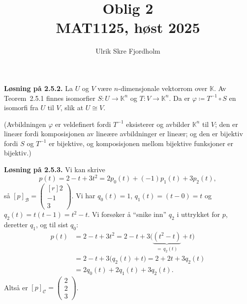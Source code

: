 \documentclass[a4paper,norsk]{article}
\title{Oblig 2 \\ MAT1125, høst 2025}
\author{Ulrik Skre Fjordholm}
\renewcommand{\phi}{\varphi}
\newcommand{\K}{\mathbb{K}}
\newcommand{\basis}{{\mathcal{B}}}
\newcommand{\basiss}{{\mathcal{C}}}
\newcommand{\from}{\colon}
\newenvironment{oppgave}[1]%
	{\trivlist{}\item\relax\textbf{Løsning på #1.}\medspace}%
	{\endtrivlist}
\begin{document}
\maketitle


\begin{oppgave}{2.5.2}
La $U$ og $V$ være $n$-dimensjonale vektorrom over $\K$. Av
Teorem~2.5.1
finnes isomorfier $S\from U\to \K^n$ og $T\from V\to\K^n$. Da er $\phi\coloneqq T^{-1}\circ S$ en isomorfi fra $U$ til $V$, slik at $U\cong V$.


(Avbildningen $\phi$ er veldefinert fordi $T^{-1}$ eksisterer og avbilder $\K^n$ til $V$; den er lineær fordi komposisjonen av lineære avbildninger er lineær; og den er bijektiv fordi $S$ og $T^{-1}$ er bijektive, og komposisjonen mellom bijektive funksjoner er bijektiv.)
\end{oppgave}


\begin{oppgave}{2.5.3}
Vi kan skrive
\[
p(t)=2-t+3t^2 = 2p_0(t)+(-1)p_1(t)+3p_2(t),
\]
så $[p]_\basis = \begin{pmatrix*}[r]
2 \\ -1 \\ 3
\end{pmatrix*}$. Vi har $q_0(t)=1$, $q_1(t)=(t-0)=t$ og $q_2(t)=t(t-1)=t^2-t$. Vi forsøker å ``snike inn'' $q_2$ i uttrykket for $p$, deretter $q_1$, og til sist $q_0$:
\begin{align*}
p(t) &= 2-t+3t^2 = 2-t+3\bigl(\underbrace{(t^2-t)}_{=\,q_2(t)}+t\bigr) \\
&= 2-t+3\bigl(q_2(t)+t\bigr)
= 2+2t+3q_2(t) \\
&= 2q_0(t)+2q_1(t)+3q_2(t).
\end{align*}
Altså er $[p]_\basiss = \begin{pmatrix}
2 \\ 2 \\ 3
\end{pmatrix}$.
\end{oppgave}
\end{document}
